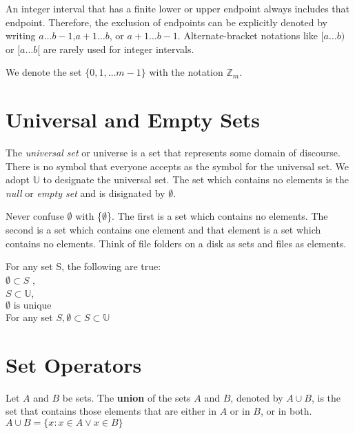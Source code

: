  An integer interval that has a finite lower or upper endpoint always includes that endpoint. Therefore, the exclusion of endpoints can be explicitly denoted by writing $a\ldots b-1$,$a+1\ldots b$, or $a+1\dots b-1$. Alternate-bracket notations like $[a\ldots b)$ or $[a\ldots b[$ are rarely used for integer intervals.

\begin{definition}
We denote the set $\{0,1,\dots m-1\}$ with the notation $\mathbb{Z}_m$.
\end{definition}

  
\section {Universal and Empty Sets}
\begin {definition} 
The \textit{universal set} or universe is a set that represents some domain of discourse. There is no symbol that everyone accepts as the symbol for the universal set. We adopt $\mathbb{U}$ to designate the universal set.
The set which contains no elements is the \textit{null} or \textit{empty set} and is disignated by $\emptyset$. 
\end {definition}

\begin{notes}
Never confuse $\emptyset$ with \{$\emptyset$\}. The first is a set which contains no elements. The second is a set which contains one element and that element is a set which contains no elements. Think of file folders on a disk as sets and files as elements.
\end{notes}

 \begin {theorem}
For any set S, the following are true:\\
$\emptyset \subset S$ , \\
$S \subset \mathbb{U}$, \\
$\emptyset \text{ is unique}$\\
For any set $S, \emptyset \subset S \subset \mathbb{U}$
\end {theorem}


\section {Set Operators}

\begin {definition} 
Let $A$ and $B$ be sets. The \textbf{union} of the sets $A$ and $B$, denoted by $A \cup B$, is the set that contains those elements that are either in $A$ or in $B$, or in both. $A \cup B=\{x:x \in A \lor x \in B\}$
\end {definition}


